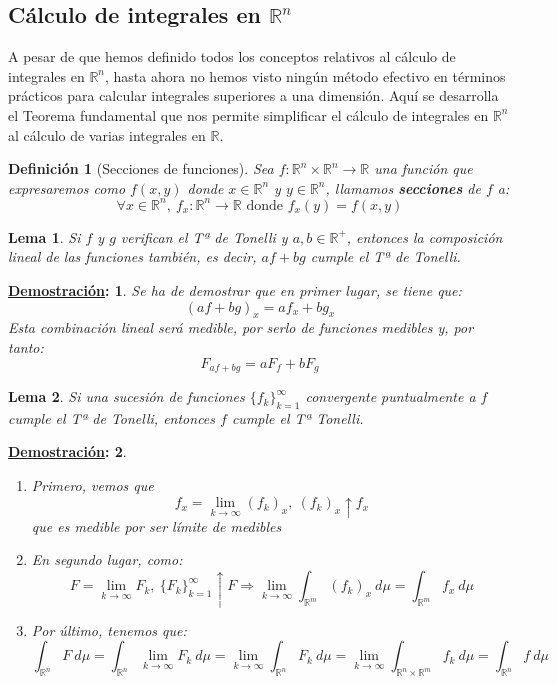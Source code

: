 \documentclass[10pt,a4paper,openright]{book}
\theoremstyle{break}
\newtheorem*{defi}{Definición}
\newtheorem*{lema}{Lema}
\newtheorem*{demo}{\underline{Demostración}:}
\newcommand{\dif}[1]{\ d#1}
\begin{document}
\subsection{Cálculo de integrales en \texorpdfstring{$\mathbb{R}^n$}{Rn}}
A pesar de que hemos definido todos los conceptos relativos al cálculo de integrales en $\mathbb{R}^n$, hasta ahora no hemos visto ningún método efectivo en términos prácticos para calcular integrales superiores a una dimensión. Aquí se desarrolla el Teorema fundamental que nos permite simplificar el cálculo de integrales en $\mathbb{R}^n$ al cálculo de varias integrales en $\mathbb{R}$.

\begin{defi}[Secciones de funciones]
Sea $f: \mathbb{R}^{n} \times \mathbb{R}^n \rightarrow \mathbb{R}$ una función que expresaremos como $f \left(x, y\right)$ donde $x \in \mathbb{R}^n$ y $y \in \mathbb{R}^n$, llamamos \textbf{secciones} de $f$ a:
$$\forall x \in \mathbb{R}^n, \ f_x: \mathbb{R}^n \rightarrow \mathbb{R} \mbox{ donde } f_x \left(y\right) = f \left(x, y\right)$$
\end{defi}

\begin{lema}
Si $f$ y $g$ verifican el Tª de Tonelli y $a, b \in \mathbb{R}^+$, entonces la composición lineal de las funciones también, es decir, $af + bg$ cumple el Tª de Tonelli.
\end{lema}
\begin{demo}
Se ha de demostrar que en primer lugar, se tiene que:
$$\left(af + bg\right)_x = af_x + bg_x$$
Esta combinación lineal será medible, por serlo de funciones medibles y, por tanto:
$$F_{af + bg} = aF_f + bF_g$$ 
\end{demo}

\begin{lema}
Si una sucesión de funciones $\{f_k\}_{k=1}^{\infty}$ convergente puntualmente a $f$ cumple el Tª de Tonelli, entonces $f$ cumple el Tª Tonelli. 
\end{lema}
\begin{demo}
\begin{enumerate}
    \item Primero, vemos que
    $$f_x = \lim_{k \rightarrow \infty} \left(f_k\right)_x,\ \left(f_k\right)_x \uparrow f_x $$
    que es medible por ser límite de medibles
    \item En segundo lugar, como: 
    $$F = \lim_{k \rightarrow \infty}F_k,\ \{F_k\}_{k=1}^{\infty} \uparrow F \Rightarrow\lim_{k \rightarrow \infty} \int_{\mathbb{R}^m} \left(f_k\right)_x \dif{\mu} = \int_{\mathbb{R}^m} f_x \dif{\mu} $$
    \item Por último, tenemos que: 
    $$\int_{\mathbb{R}^n} F \dif{\mu} = \int_{\mathbb{R}^n} \lim_{k \rightarrow \infty}F_k  \dif{\mu} = \lim_{k \rightarrow \infty}\int_{\mathbb{R}^n} F_k \dif{\mu} = \lim_{k \rightarrow \infty} \int_{\mathbb{R}^n \times \mathbb{R}^m} f_k  \dif{\mu} = \int_{\mathbb{R}^n} f \dif{\mu}  $$
\end{enumerate}
\end{demo}
\end{document}
